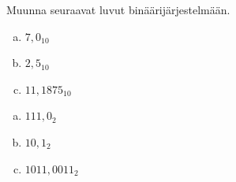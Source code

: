 \begin{tehtava}
Muunna seuraavat luvut binäärijärjestelmään.
	\begin{enumerate}[a)]
		\item $7,0_{10}$
		\item $2,5_{10}$
		\item $11,1875_{10}$
	\end{enumerate}
\begin{vastaus}
	\begin{enumerate}[a)]
		\item $111,0_2$
		\item $10,1_2$
		\item $1011,0011_2$
	\end{enumerate}
\end{vastaus}
\end{tehtava}

